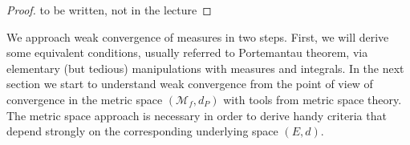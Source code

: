 \begin{proof}[Proof]
	to be written, not in the lecture
\end{proof}
	\marginpar{\textcolor{red}{Lecture 12}}
We approach weak convergence of measures in two steps. First, we will derive some equivalent conditions, usually referred to Portemantau theorem, via elementary (but tedious) manipulations with measures and integrals. In the next section we start to understand weak convergence from the point of view of convergence in the metric space $(\mathcal M_f,d_P)$ with tools from metric space theory. The metric space approach is necessary in order to derive handy criteria that depend strongly on the corresponding underlying space $(E,d)$.\smallskip

